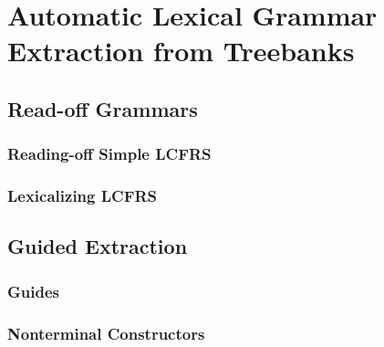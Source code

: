 \documentclass[../document.tex]{subfiles}
\begin{document}
    \chapter{Automatic Lexical Grammar Extraction from Treebanks}
    \section{Read-off Grammars}
    \subsection{Reading-off Simple LCFRS}
    \subsection{Lexicalizing LCFRS}
    \section{Guided Extraction}
    \subsection{Guides}
    \subsection{Nonterminal Constructors}
\end{document}
